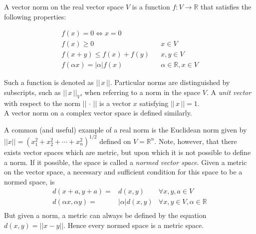 \documentclass[12pt]{article}
\begin{document}
A vector norm on the real vector space $V$ is a function $f : V \to \mathbb{R}$ that satisfies the following properties:

\begin{eqnarray*}
    f(x) = 0 \iff x = 0 && \\
    f(x) \ge 0          && x \in V \\
    f(x+y) \leq f(x)+f(y) && x,y \in V \\
    f(\alpha x) = |\alpha|f(x) && \alpha \in \mathbb{R},x\in V
\end{eqnarray*}

Such a function is denoted as $||\,x\,||$.  Particular norms are distinguished by subscripts, such
as $||\,x\,||_V$, when referring to a norm in the space $V$.  A \emph{unit vector} with respect to the norm $||\,\cdot\,||$ is a vector $x$ satisfying
$||\,x\,|| = 1$.\\

A vector norm on a complex vector space is defined similarly.

A common (and useful) example of a real norm is the Euclidean norm given by $||x||=(x_1^2 + x_2^2 +  \cdots + x_n^2)^{1/2}$ defined on $V=\mathbb{R}^n$.
Note, however, that there exists vector spaces which are metric, but upon which it is not possible to define a norm. If it possible, the space is called a {\em normed vector space}. Given a metric on the vector space, a necessary and sufficient condition for this space to be a normed space, is
\begin{eqnarray*}
     d(x+a,y+a)=&d(x,y) & \forall x,y,a \in V\\
     d(\alpha x,\alpha y)=&|\alpha|d(x,y) &\forall x,y \in V, \alpha \in \mathbb{R}\\
\end{eqnarray*}
But given a norm, a metric can always be defined by the equation $ d(x,y)=||x-y||$. Hence every normed space is a metric space.
\end{document}

